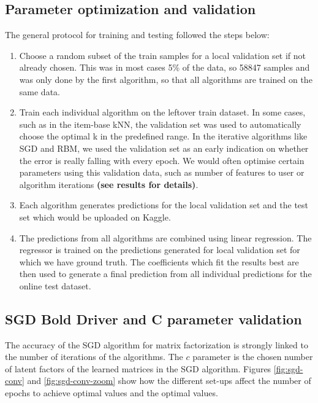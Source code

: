 \documentclass[10pt,conference,compsocconf]{IEEEtran}
\begin{document}
	\subsection{Parameter optimization and validation} 
	The general protocol for training and testing followed the steps below:
	
	\begin{enumerate}
		\item Choose a random subset of the train samples for a local validation set if not already chosen. This was in most cases 5\% of the data, so 58847 samples and was only done by the first algorithm, so that all algorithms are trained on the same data.
		
		\item Train each individual algorithm on the leftover train dataset. In some cases, such as in the item-base kNN, the validation set was used to automatically choose the optimal k in the predefined range. In the iterative algorithms like SGD and RBM, we used the validation set as an early indication on whether the error is really falling with every epoch. We would often optimise certain parameters using this validation data, such as number of features to user or algorithm iterations \textbf{(see results for details)}.
		
		\item Each algorithm generates predictions for the local validation set and the test set which would be uploaded on Kaggle.
		
		\item The predictions from all algorithms are combined using linear regression. The regressor is trained on the predictions generated for local validation set for which we have ground truth. The coefficients which fit the results best are then used to generate a final prediction from all individual predictions for the online test dataset.
		
	\end{enumerate}
	
	
	\subsection{SGD Bold Driver and C parameter validation}
	The accuracy of the SGD algorithm for matrix factorization is strongly linked to the number of iterations of the algorithms. The $c$ parameter is the chosen number of latent factors of the learned matrices in the SGD algorithm. Figures \ref{fig:sgd-conv} and \ref{fig:sgd-conv-zoom} show how the different set-ups affect the number of epochs to achieve optimal values and the optimal values.
	
\end{document}
